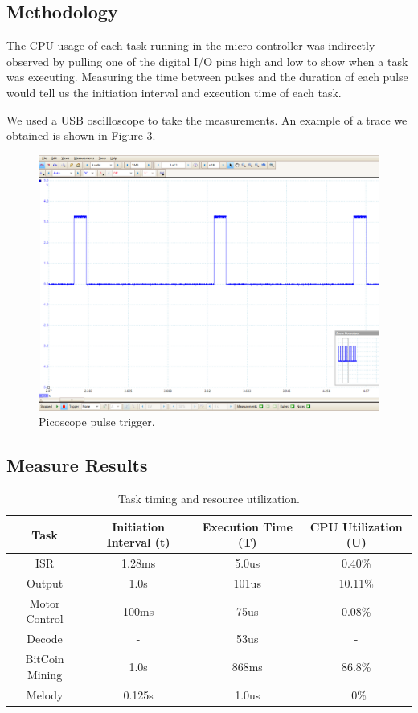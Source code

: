 \documentclass{article}
\begin{document}
\subsection{Methodology}

\noindent
The CPU usage of each task running in the micro-controller was indirectly observed by pulling one of the digital I/O pins high and low to show when a task was executing. Measuring the time between pulses and the duration of each pulse would tell us the initiation interval and execution time of each task.

\bigskip

\noindent
We used a USB oscilloscope to take the measurements. An example of a trace we obtained is shown in Figure 3.

\begin{figure}[H]
\begin{center}
   \includegraphics[width=0.6\linewidth]{ScopeOutput.png}
\end{center}
   \caption{Picoscope pulse trigger.}
\label{fig:long}
\label{fig:onecol}
\end{figure}


\subsection{Measure Results}

\begin{table}[ht]
\centering                      %
\begin{tabular}{c c c c}        %
Task & Initiation Interval (t) & Execution Time (T) & CPU Utilization (U) \\ [0.5ex]   %
\hline                          %
ISR & 1.28ms & 5.0us & 0.40\% \\           %
Output & 1.0s & 101us & 10.11\% \\
Motor Control & 100ms & 75us  & 0.08\% \\
Decode & - & 53us & - \\
BitCoin Mining & 1.0s & 868ms & 86.8\% \\
Melody & 0.125s & 1.0us & ~0\% \\[1ex]     %
\end{tabular}
\caption{Task timing and resource utilization.}
\label{table:nonlin}            %
\end{table}
\end{document}
